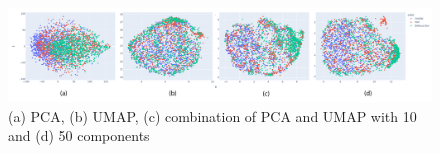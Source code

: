 \begin{figure}[H]
	\begin{center}
		\includegraphics[width=\linewidth]{bilder/unet-embeddings/umap-pca-embeddings.png}
		\caption{(a) PCA, (b) UMAP, (c) combination of PCA and UMAP with 10 and (d) 50 components}\label{fig:umap-pca-embeddings}
	\end{center}
\end{figure}
